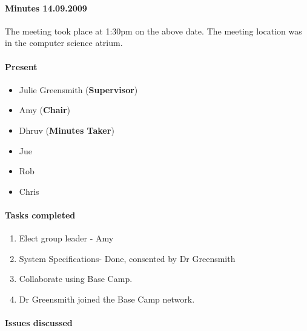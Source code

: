 \paragraph{Minutes 14.09.2009}  
The meeting took place at 1:30pm on the above date. The meeting location was in the computer science atrium. 

\paragraph{Present}

\begin{itemize}
	\item Julie Greensmith (\textbf{Supervisor})
	\item Amy (\textbf{Chair})
	\item Dhruv (\textbf{Minutes Taker})
	\item Jue
	\item Rob
	\item Chris 
\end{itemize}

\paragraph{Tasks completed}

\begin{enumerate}
	\item Elect group leader - Amy
	\item System Specifications- Done, consented by Dr Greensmith
	\item Collaborate using Base Camp.
	\item Dr Greensmith joined the Base Camp network.
\end{enumerate}


\paragraph{Issues discussed}

